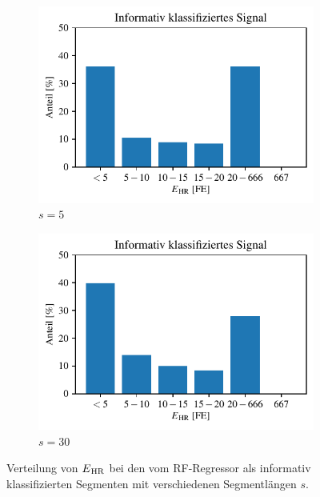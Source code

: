  \begin{figure}[H]
 	\centering
		\begin{subfigure}{.45\textwidth}
			\centering
 			\includegraphics[scale=0.7]{pic/rf-regr-s5-h20-positives.pdf}
 			\caption{$s=5$}
 		\end{subfigure}
    	\begin{subfigure}{.45\textwidth}
    		\centering
 			\includegraphics[scale=0.7]{pic/rf-regr-s30-h20-positives.pdf}
 			\caption{$s=30$}
 		\end{subfigure}
 	\caption{Verteilung von $E\textsubscript{HR}$ bei den vom \ac{RF}-Regressor als informativ klassifizierten Segmenten mit verschiedenen Segmentlängen $s$.}
 	\label{fig:rf-regr-var-s-positives}
 \end{figure}
 
